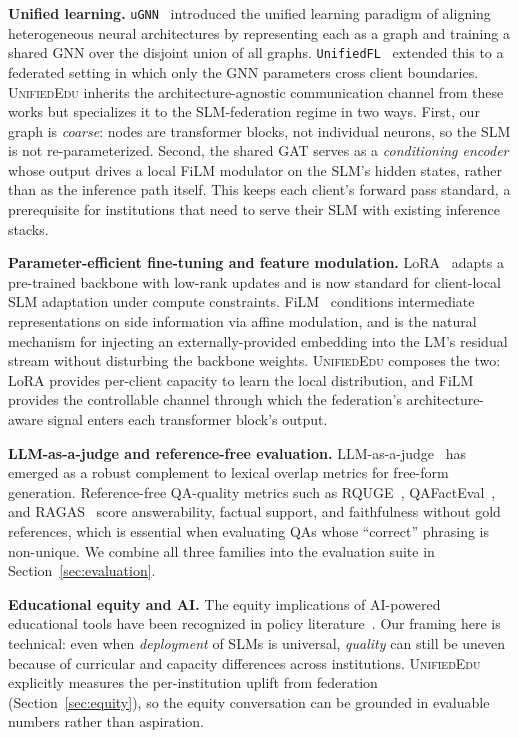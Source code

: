 \documentclass[11pt]{article}
\theoremstyle{plain}
\theoremstyle{definition}
\theoremstyle{remark}
\newcommand{\UniEdu}{\textsc{UnifiedEdu}}
\begin{document}
\textbf{Unified learning.}
\texttt{uGNN}~\citep{pala2026ugnn} introduced the
unified learning paradigm of aligning heterogeneous
neural architectures by representing each as a graph
and training a shared GNN over the disjoint union of
all graphs. \texttt{UnifiedFL}~\citep{pala2025unifiedfl}
extended this to a federated setting in which only
the GNN parameters cross client boundaries. \UniEdu{}
inherits the architecture-agnostic communication
channel from these works but specializes it to the
SLM-federation regime in two ways. First, our graph
is \emph{coarse}: nodes are transformer blocks, not
individual neurons, so the SLM is not
re-parameterized. Second, the shared GAT serves as a
\emph{conditioning encoder} whose output drives a
local FiLM modulator on the SLM's hidden states,
rather than as the inference path itself. This keeps
each client's forward pass standard, a prerequisite
for institutions that need to serve their SLM with
existing inference stacks.

\textbf{Parameter-efficient fine-tuning and feature
modulation.} LoRA~\citep{hu2022lora} adapts a
pre-trained backbone with low-rank updates and is now
standard for client-local SLM adaptation under
compute constraints. FiLM~\citep{perez2018film}
conditions intermediate representations on side
information via affine modulation, and is the natural
mechanism for injecting an externally-provided
embedding into the LM's residual stream without
disturbing the backbone weights. \UniEdu{} composes
the two: LoRA provides per-client capacity to learn
the local distribution, and FiLM provides the
controllable channel through which the federation's
architecture-aware signal enters each transformer
block's output.

\textbf{LLM-as-a-judge and reference-free evaluation.}
LLM-as-a-judge~\citep{zheng2023judging} has emerged
as a robust complement to lexical overlap metrics for
free-form generation. Reference-free QA-quality
metrics such as RQUGE~\citep{mohammadshahi2023rquge},
QAFactEval~\citep{fabbri2022qafacteval}, and
RAGAS~\citep{es2023ragas} score answerability,
factual support, and faithfulness without gold
references, which is essential when evaluating
QAs whose ``correct'' phrasing is non-unique. We
combine all three families into the evaluation suite
in Section~\ref{sec:evaluation}.

\textbf{Educational equity and AI.}
The equity implications of AI-powered educational
tools have been recognized in policy
literature~\citep{unterhalter2019measuring,
miao2021artificial}. Our framing here is technical:
even when \emph{deployment} of SLMs is universal,
\emph{quality} can still be uneven because of curricular
and capacity differences across institutions. \UniEdu{}
explicitly measures the per-institution uplift from
federation (Section~\ref{sec:equity}), so the equity
conversation can be grounded in evaluable numbers
rather than aspiration.
\end{document}
